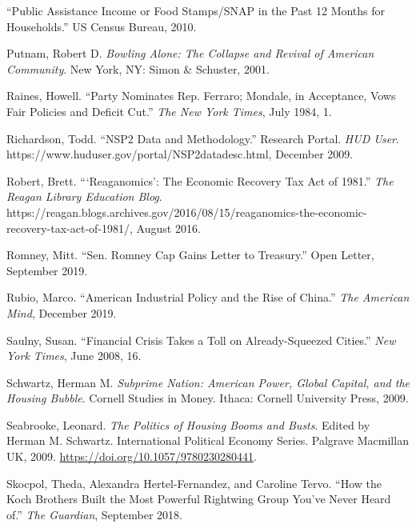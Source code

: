 \documentclass[12pt,oneside]{psthesis}
\begin{document}
\leavevmode\hypertarget{ref-2010public}{}%
``Public Assistance Income or Food Stamps/SNAP in the Past 12 Months for Households.'' US Census Bureau, 2010.

\leavevmode\hypertarget{ref-putnam2001bowling}{}%
Putnam, Robert D. \emph{Bowling Alone: The Collapse and Revival of American Community}. New York, NY: Simon \& Schuster, 2001.

\leavevmode\hypertarget{ref-raines1984party}{}%
Raines, Howell. ``Party Nominates Rep. Ferraro; Mondale, in Acceptance, Vows Fair Policies and Deficit Cut.'' \emph{The New York Times}, July 1984, 1.

\leavevmode\hypertarget{ref-richardson2009nsp2}{}%
Richardson, Todd. ``NSP2 Data and Methodology.'' Research Portal. \emph{HUD User}. https://www.huduser.gov/portal/NSP2datadesc.html, December 2009.

\leavevmode\hypertarget{ref-robert2016reaganomics}{}%
Robert, Brett. ```Reaganomics': The Economic Recovery Tax Act of 1981.'' \emph{The Reagan Library Education Blog}. https://reagan.blogs.archives.gov/2016/08/15/reaganomics-the-economic-recovery-tax-act-of-1981/, August 2016.

\leavevmode\hypertarget{ref-romney2019sen}{}%
Romney, Mitt. ``Sen. Romney Cap Gains Letter to Treasury.'' Open Letter, September 2019.

\leavevmode\hypertarget{ref-rubio2019american}{}%
Rubio, Marco. ``American Industrial Policy and the Rise of China.'' \emph{The American Mind}, December 2019.

\leavevmode\hypertarget{ref-saulny2008financial}{}%
Saulny, Susan. ``Financial Crisis Takes a Toll on Already-Squeezed Cities.'' \emph{New York Times}, June 2008, 16.

\leavevmode\hypertarget{ref-schwartz2009subprime}{}%
Schwartz, Herman M. \emph{Subprime Nation: American Power, Global Capital, and the Housing Bubble}. Cornell Studies in Money. Ithaca: Cornell University Press, 2009.

\leavevmode\hypertarget{ref-seabrooke2009politics}{}%
Seabrooke, Leonard. \emph{The Politics of Housing Booms and Busts}. Edited by Herman M. Schwartz. International Political Economy Series. Palgrave Macmillan UK, 2009. \url{https://doi.org/10.1057/9780230280441}.

\leavevmode\hypertarget{ref-skocpol2018how}{}%
Skocpol, Theda, Alexandra Hertel-Fernandez, and Caroline Tervo. ``How the Koch Brothers Built the Most Powerful Rightwing Group You've Never Heard of.'' \emph{The Guardian}, September 2018.
\end{document}
